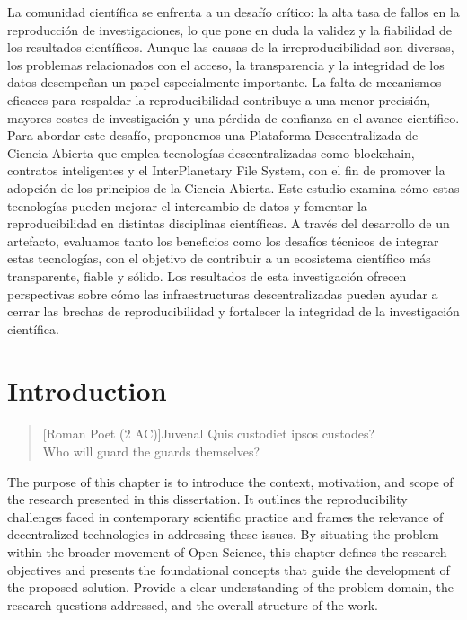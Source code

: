 \documentclass[final]{rc-book-2.14}
\begin{document}
\drop La comunidad científica se enfrenta a un desafío crítico: la alta tasa de fallos en la reproducción de investigaciones, lo que pone en duda la validez y la fiabilidad de los resultados científicos. Aunque las causas de la irreproducibilidad son diversas, los problemas relacionados con el acceso, la transparencia y la integridad de los datos desempeñan un papel especialmente importante. La falta de mecanismos eficaces para respaldar la reproducibilidad contribuye a una menor precisión, mayores costes de investigación y una pérdida de confianza en el avance científico. Para abordar este desafío, proponemos una Plataforma Descentralizada de Ciencia Abierta que emplea tecnologías descentralizadas como blockchain, contratos inteligentes y el InterPlanetary File System, con el fin de promover la adopción de los principios de la Ciencia Abierta. Este estudio examina cómo estas tecnologías pueden mejorar el intercambio de datos y fomentar la reproducibilidad en distintas disciplinas científicas. A través del desarrollo de un artefacto, evaluamos tanto los beneficios como los desafíos técnicos de integrar estas tecnologías, con el objetivo de contribuir a un ecosistema científico más transparente, fiable y sólido. Los resultados de esta investigación ofrecen perspectivas sobre cómo las infraestructuras descentralizadas pueden ayudar a cerrar las brechas de reproducibilidad y fortalecer la integridad de la investigación científica.


\mainmatter


\chapter{Introduction}
\label{chp:introduction}

\begin{quotation}[Roman Poet (2 AC)]{Juvenal}
    Quis custodiet ipsos custodes? \\ Who will guard the guards themselves?
\end{quotation}


\drop The purpose of this chapter is to introduce the context, motivation, and scope of the research presented in this dissertation. It outlines the reproducibility challenges faced in contemporary scientific practice and frames the relevance of decentralized technologies in addressing these issues. By situating the problem within the broader movement of Open Science, this chapter defines the research objectives and presents the foundational concepts that guide the development of the proposed solution. Provide a clear understanding of the problem domain, the research questions addressed, and the overall structure of the work.
\end{document}
